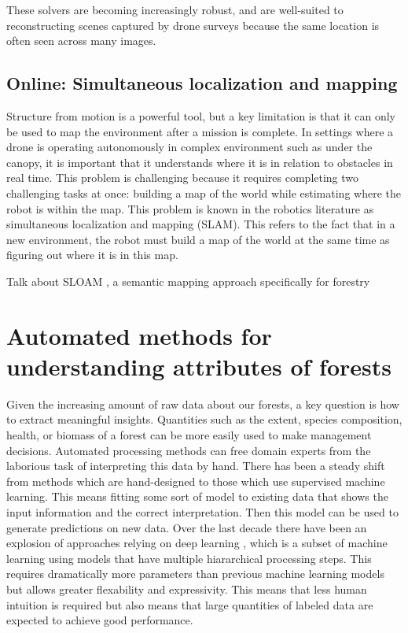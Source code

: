 These solvers are becoming increasingly robust, and are well-suited to reconstructing scenes captured by drone surveys because the same location is often seen across many images.

\subsection{Online: Simultaneous localization and mapping}
Structure from motion is a powerful tool, but a key limitation is that it can only be used to map the environment after a mission is complete. In settings where a drone is operating autonomously in complex environment such as under the canopy, it is important that it understands where it is in relation to obstacles in real time. This problem is challenging because it requires completing two challenging tasks at once: building a map of the world while estimating where the robot is within the map. This problem is known in the robotics literature as simultaneous localization and mapping (SLAM). This refers to the fact that in a new environment, the robot must build a map of the world at the same time as figuring out where it is in this map. 


Talk about SLOAM \cite{Chen2020SLOAM:Inventory}, a semantic mapping approach specifically for forestry 

%    


\section{Automated methods for understanding attributes of forests}
Given the increasing amount of raw data about our forests, a key question is how to extract meaningful insights. Quantities such as the extent, species composition, health, or biomass of a forest can be more easily used to make management decisions. Automated processing methods can free domain experts from the laborious task of interpreting this data by hand. There has been a steady shift from methods which are hand-designed to those which use supervised machine learning. This means fitting some sort of model to existing data that shows the input information and the correct interpretation. Then this model can be used to generate predictions on new data. Over the last decade there have been an explosion of approaches relying on deep learning \cite{Lecun2015DeepLearning}, which is a subset of machine learning using models that have multiple hiararchical processing steps. This requires dramatically more parameters than previous machine learning models but allows greater flexability and expressivity. This means that less human intuition is required but also means that large quantities of labeled data are expected to achieve good performance. 



